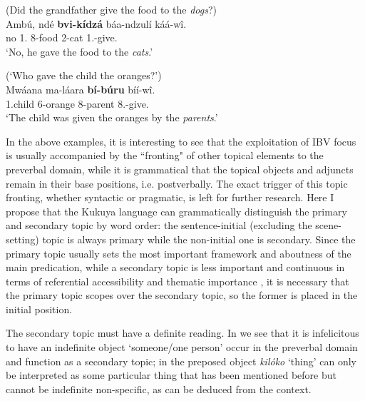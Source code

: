 \documentclass[output=paper,colorlinks,citecolor=brown,
]{langscibook}
\begin{document}
\begin{exe}
\ex
\label{108}
 (Did the grandfather give the food to the \textit{dogs}?) \\
\gll
Ambú, ndé \textbf{bvi-kídzá} báa-ndzulí káá-wî.\\
no 1.\Pro{} 8-food 2-cat 1\Sm{}.\Pst{}-give.\Pst{}\\
\trans ‘No, he gave the food to the \textit{cats}.’


\ex
\label{109}
 (`Who gave the child the oranges?') \\
\gll
Mwáana ma-láara \textbf{bí-búru} bíí-wî.\\
1.child 6-orange 8-parent 8\Sm{}.\Pst{}-give.\Pst{}\\
\trans ‘The child was given the oranges by the \textit{parents}.’

\end{exe}
In the above examples, it is interesting to see that the exploitation of IBV focus is usually accompanied by the ``fronting" of other topical elements to the preverbal domain, while it is grammatical that the topical objects and adjuncts remain in their base positions, i.e. postverbally. The exact trigger of this topic fronting, whether syntactic or pragmatic, is left for further research. Here I propose that the Kukuya language can grammatically distinguish the primary and secondary topic by word order: the sentence-initial (excluding the scene-setting) topic is always primary while the non-initial one is secondary. Since the primary topic usually sets the most important framework and aboutness of the main predication, while a secondary topic is less important and continuous in terms of referential accessibility and thematic importance \citep{Givón1990, Nikolaeva2001, Croft1991, Tsao1987, Shi2000}, it is necessary that the primary topic scopes over the secondary topic, so the former is placed in the initial position.


The secondary topic must have a definite reading. In  we see that it is infelicitous to have an indefinite object `someone/one person' occur in the preverbal domain and function as a secondary topic; in  the preposed object \textit{kilóko} `thing' can only be interpreted as some particular thing that has been mentioned before but cannot be indefinite non-specific, as can be deduced from the context.
\end{document}
